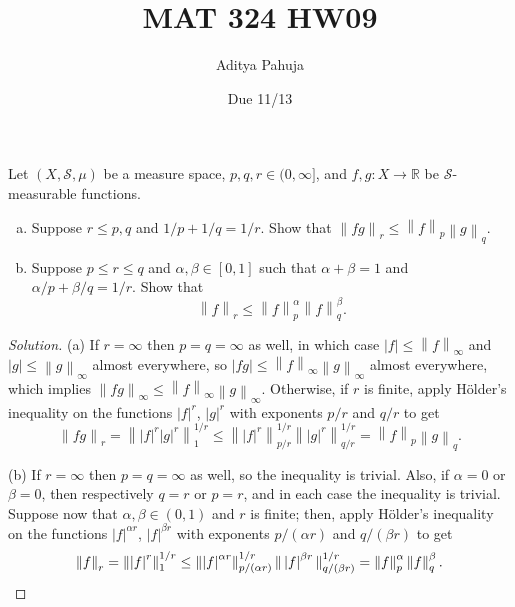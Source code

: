 \documentclass[10pt]{article}
\title{MAT 324 HW09}
\author{\large Aditya Pahuja}
\date{\large Due 11/13}
\providecommand{\RR}{\mathbb R}
\providecommand{\ii}{\item}
\newenvironment{soln}{\begin{proof}[Solution]}{\end{proof}}
\providecommand{\abs}[1]{\left\lvert #1\right\rvert}
\providecommand{\norm}[1]{\left\| #1\right\|}
\begin{document}
\maketitle

\begin{problem}
    Let $(X,\mathcal S,\mu)$ be a measure space, $p,q,r\in(0,\infty]$,
    and $f,g\colon X\to\RR$ be $\mathcal S$-measurable functions.
    \begin{enumerate}[(a)]
        \ii Suppose $r\le p,q$ and $1/p + 1/q = 1/r$. Show that
	$\norm{fg}_r \le \norm{f}_p\norm{g}_q$.
	\ii Suppose $p\le r\le q$ and $\alpha,\beta\in[0,1]$ such that
	$\alpha+\beta=1$ and $\alpha/p + \beta/q = 1/r$. Show that
	\begin{equation*}
	    \norm{f}_r \le \norm{f}_p^\alpha\norm{f}_q^\beta.
	\end{equation*}
    \end{enumerate}
\end{problem}

\begin{soln}
    (a) If $r = \infty$ then $p=q=\infty$ as well, in which case
    $\abs f \le \norm{f}_\infty$ and $\abs g \le \norm{g}_\infty$
    almost everywhere, so $\abs{fg}\le\norm{f}_\infty\norm{g}_\infty$
    almost everywhere, which implies $\norm{fg}_\infty\le\norm f_\infty\norm g_\infty$.
    Otherwise, if $r$ is finite,
    apply H\"older's inequality on the functions $\abs f^r$, $\abs g^r$
    with exponents $p/r$ and $q/r$ to get
    \begin{equation*}
	\norm{fg}_r = \norm{\abs f^r\abs g^r}_1^{1/r} \le
	\norm{\abs f^r}_{p/r}^{1/r}\norm{\abs g^r}_{q/r}^{1/r}
	= \norm{f}_p\norm{g}_q.
    \end{equation*}

    (b) If $r = \infty$ then $p=q=\infty$ as well, so the inequality is trivial.
    Also, if $\alpha = 0$ or $\beta = 0$, then respectively
    $q = r$ or $p = r$, and in each case the inequality is trivial.
    Suppose now that $\alpha,\beta\in(0,1)$ and $r$ is finite;
    then, apply H\"older's inequality on the functions
    $\abs f^{\alpha r}$, $\abs f^{\beta r}$
    with exponents $p/(\alpha r)$ and $q/(\beta r)$ to get
    \begin{equation*}
	\norm{f}_r = \norm{\abs f^{r}}_{1}^{1/r}
	\le \norm{\abs f^{\alpha r}}_{p/(\alpha r)}^{1/r}
	\|\abs f^{\beta r}\|_{q/(\beta r)}^{1/r}
	= \norm{f}_p^{\alpha} \norm{f}_q^{\beta}.\qedhere
    \end{equation*}
\end{soln}
\end{document}
